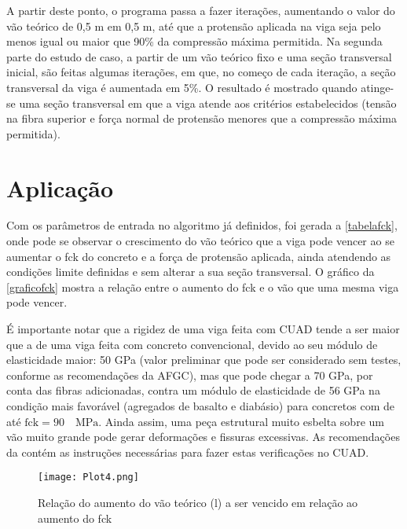 A partir deste ponto, o programa passa a fazer iterações, aumentando o valor do vão teórico de 0,5 m em 0,5 m, até que a protensão aplicada na viga seja pelo menos igual ou maior que 90\% da compressão máxima permitida. Na segunda parte do estudo de caso, a partir de um vão teórico fixo e uma seção transversal inicial, são feitas algumas iterações, em que, no começo de cada iteração, a seção transversal da viga é aumentada em 5\%.  O resultado é mostrado quando atinge-se uma seção transversal em que a viga atende aos critérios estabelecidos (tensão na fibra superior e força normal de protensão menores que a compressão máxima  permitida).

\section{Aplicação}

Com os parâmetros de entrada no algoritmo já definidos, foi gerada a \autoref{tabelafck}, onde pode se observar o crescimento do vão teórico que a viga pode vencer ao se aumentar o fck do concreto e a força de protensão aplicada, ainda atendendo as condições limite definidas e sem alterar a sua seção transversal. O  gráfico da \autoref{graficofck} mostra a relação entre o aumento do fck e o vão que uma mesma viga pode vencer.

É importante notar que a rigidez de uma viga feita com CUAD tende a ser maior que a de uma viga feita com concreto convencional, devido ao seu módulo de elasticidade maior: 50 GPa (valor preliminar que pode ser considerado sem testes, conforme as recomendações da AFGC), mas que pode chegar a 70 GPa, por conta das fibras adicionadas, contra um módulo de elasticidade de 56 GPa na condição mais favorável (agregados de basalto e diabásio) para concretos com de até $ \text{fck} = 90 \quad \text{MPa}  $. Ainda assim, uma peça estrutural muito esbelta sobre um vão muito grande pode gerar deformações e fissuras excessivas. As recomendações da  contém as instruções necessárias para fazer estas verificações no CUAD.

\begin{figure}[htb]
	\caption{\label{graficofck} Relação do aumento do vão teórico (l) a ser vencido em relação ao aumento do fck}
	\begin{center}
		\texttt{[image: Plot4.png]}
	\end{center}
\end{figure}

